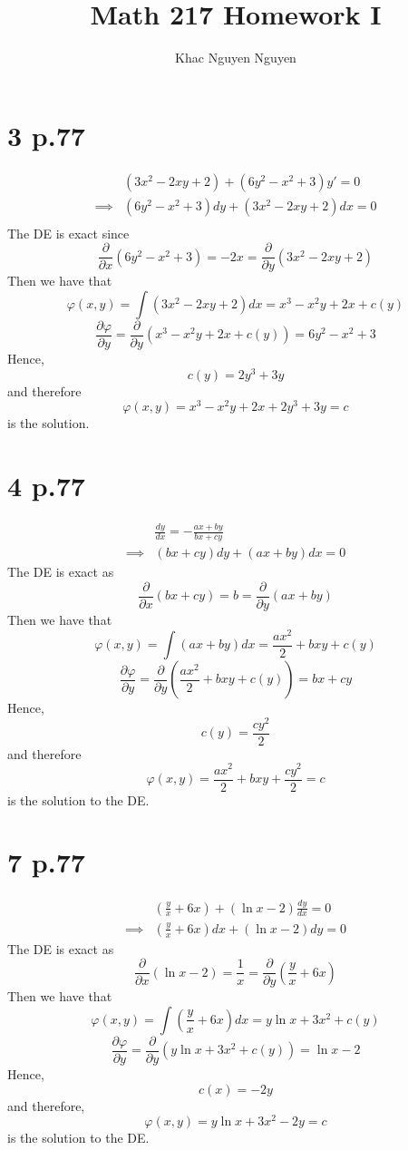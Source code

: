 \documentclass[11pt]{report}
\title{\textbf{Math 217 Homework I}}
\author{Khac Nguyen Nguyen}
\date{}
\begin{document}
\section*{3 p.77}
\begin{equation*}
    \begin{aligned}
        & (3x^2 - 2xy + 2) + (6y^2-x^2+3)y' = 0 \\
        \implies &(6y^2 - x^2 + 3)dy + (3x^2-2xy+2)dx = 0 \\
    \end{aligned}
\end{equation*}
The DE is exact since
\[
    \frac{\partial }{\partial x}(6y^2-x^2+3) = -2x = \frac{\partial}{\partial y}  (3x^2-2xy+2)
\]
Then we have that
\[
    \varphi (x,y) = \int (3x^2-2xy+2) dx = x^3-x^2y +2x + c(y)
\]
\[
    \frac{\partial \varphi}{\partial y} = \frac{\partial}{\partial y}(x^3-x^2y+2x+c(y)) = 6y^2 - x^2 + 3
\]
Hence,
\[
    c(y) = 2y^3 + 3y
\]
and therefore
\[
    \varphi(x,y) = x^3-x^2y +2x + 2y^3+3y = c
\]
is the solution.
\newpage
\section*{4 p.77}
\begin{equation*}
    \begin{aligned}
        &\frac{dy}{dx} = - \frac{ax+by}{bx+cy} \\
        \implies & (bx+cy)dy + (ax+by)dx = 0
    \end{aligned}
\end{equation*}
The DE is exact as
\[
    \frac{\partial }{\partial x}(bx+cy) = b = \frac{\partial }{\partial y}(ax+by)
\]
Then we have that
\[
    \varphi(x,y) = \int (ax+by) dx = \frac{ax^2}{2} + bxy + c(y)
\]
\[
    \frac{\partial \varphi}{\partial y} = \frac{\partial}{\partial y}(\frac{ax^2}{2}+bxy+c(y)) = bx+cy
\]
Hence,
\[
    c(y) = \frac{cy^2}{2}
\]
and therefore
\[
    \varphi(x,y) = \frac{ax^2}{2} + bxy + \frac{cy^2}{2} = c
\]
is the solution to the DE.
\newpage
\section*{7 p.77}
\begin{equation*}
    \begin{aligned}
        &\left( \frac{y}{x} +6x \right) + ( \ln x - 2) \frac{dy}{dx} = 0 \\
        \implies &\left( \frac{y}{x} +6x \right)dx + ( \ln x - 2) dy = 0
    \end{aligned}
\end{equation*}
The DE is exact as
\[
    \frac{\partial}{\partial x}(\ln x-2) = \frac{1}{x} = \frac{\partial}{\partial y}\left(\frac{y}{x} +6x\right)
\]
Then we have that
\[
    \varphi(x,y) = \int \left(\frac{y}{x} + 6x \right) dx = y \ln x + 3x^2 + c(y)
\]
\[
    \frac{\partial \varphi}{\partial y} = \frac{\partial }{\partial y}\left(y \ln x + 3x^2 + c(y) \right) = \ln x - 2
\]
Hence,
\[
    c(x) =  -2y
\]
and therefore,
\[
    \varphi(x,y) = y\ln x + 3x^2 -2y = c
\]
is the solution to the DE.
\newpage
\end{document}

